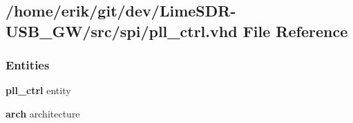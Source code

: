 \subsection{/home/erik/git/dev/\+Lime\+S\+D\+R-\/\+U\+S\+B\+\_\+\+G\+W/src/spi/pll\+\_\+ctrl.vhd File Reference}
\label{pll__ctrl_8vhd}
\subsubsection*{Entities}
\begin{DoxyCompactItemize}
\item 
{\bf pll\+\_\+ctrl} entity
\item 
{\bf arch} architecture
\end{DoxyCompactItemize}
